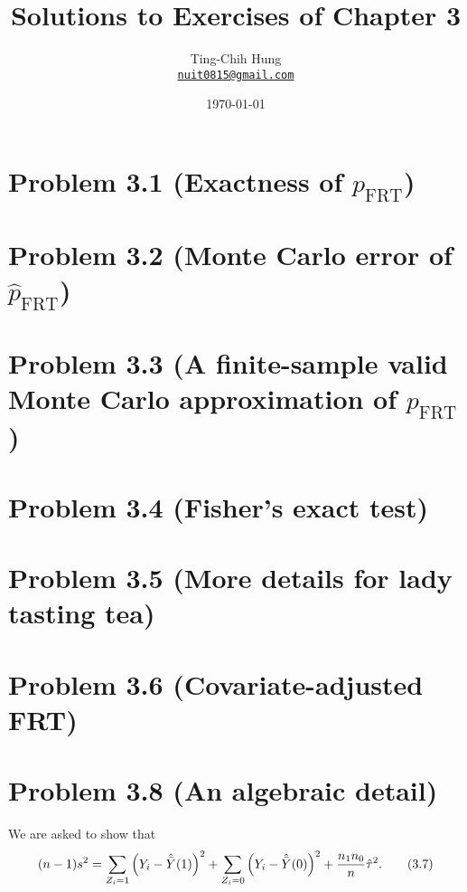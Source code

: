 \documentclass[10pt]{article}
\title{Solutions to Exercises of Chapter 3}
\author{Ting-Chih Hung \\ \href{mailto:nuit0815@gmail.com}{\texttt{nuit0815@gmail.com}}}
\date{\today}
\begin{document}
\maketitle


\section*{Problem 3.1 (Exactness of $p_{\mathrm{FRT}}$)}

\section*{Problem 3.2 (Monte Carlo error of $\hat{p}_{\mathrm{FRT}}$)}

\section*{Problem 3.3 (A finite-sample valid Monte Carlo approximation of $p_{\mathrm{FRT}}$)}

\section*{Problem 3.4 (Fisher's exact test)}

\section*{Problem 3.5 (More details for lady tasting tea)}

\section*{Problem 3.6 (Covariate-adjusted FRT)}

\section*{Problem 3.8 (An algebraic detail)}

We are asked to show that
\begin{align*}
  (n - 1) s^2 
  = \sum_{Z_i = 1} {\left( Y_i - \hat{\bar{Y}}(1) \right)}^2 
    + \sum_{Z_i = 0} {\left( Y_i - \hat{\bar{Y}}(0) \right)}^2
    + \frac{n_1 n_0}{n} \hat{\tau}^2.
  \tag{3.7}
\end{align*}
\end{document}
